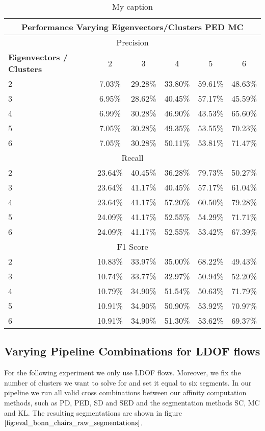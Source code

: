\begin{table}[H]
\centering
\begin{tabular}{|l|c|c|c|c|c|}
\hline
\multicolumn{6}{|c|}{Performance Varying Eigenvectors/Clusters PED MC} \\ \hline
\multicolumn{6}{|c|}{Precision} \\ \hline
\textbf{Eigenvectors / Clusters} & 2 & 3 & 4 & 5 & 6 \\ \hline
2 & 7.03\% & 29.28\% & 33.80\% & 59.61\% & 48.63\%  \\ \hline
3 & 6.95\% & 28.62\% & 40.45\% & 57.17\% & 45.59\%  \\ \hline
4 & 6.99\% & 30.28\% & 46.90\% & 43.53\% & 65.60\%  \\ \hline
5 & 7.05\% & 30.28\% & 49.35\% & 53.55\% & 70.23\%  \\ \hline
6 & 7.05\% & 30.28\% & 50.11\% & 53.81\% & 71.47\%  \\ \hline
\multicolumn{6}{|c|}{Recall} \\ \hline
2 & 23.64\% & 40.45\% & 36.28\% & 79.73\% & 50.27\%  \\ \hline
3 & 23.64\% & 41.17\% & 40.45\% & 57.17\% & 61.04\%  \\ \hline
4 & 23.64\% & 41.17\% & 57.20\% & 60.50\% & 79.28\%  \\ \hline
5 & 24.09\% & 41.17\% & 52.55\% & 54.29\% & 71.71\%  \\ \hline
6 & 24.09\% & 41.17\% & 52.55\% & 53.42\% & 67.39\%  \\ \hline
\multicolumn{6}{|c|}{F1 Score} \\ \hline
2 & 10.83\% & 33.97\% & 35.00\% & 68.22\% & 49.43\%  \\ \hline
3 & 10.74\% & 33.77\% & 32.97\% & 50.94\% & 52.20\%  \\ \hline
4 & 10.79\% & 34.90\% & 51.54\% & 50.63\% & 71.79\%  \\ \hline
5 & 10.91\% & 34.90\% & 50.90\% & 53.92\% & 70.97\%  \\ \hline
6 & 10.91\% & 34.90\% & 51.30\% & 53.62\% & 69.37\%  \\ \hline
\end{tabular}
\caption[Performance Varying Eigenvector-Cluster]{My caption}
\label{tab:wh_ev_c}
\end{table}

\subsection{Varying Pipeline Combinations for LDOF flows}
For the following experiment we only use LDOF flows. Moreover, we fix the number of clusters we want to solve for and set it equal to six segments. In our pipeline we run all valid cross combinations between our affinity computation methods, such as PD, PED, SD and SED and the segmentation methods SC, MC and KL. The resulting segmentations are shown in figure $\ref{fig:eval_bonn_chairs_raw_segmentations}$.

